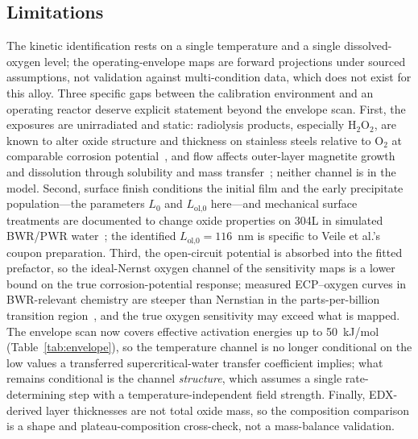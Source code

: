 \documentclass[preprint,12pt]{elsarticle}
\begin{document}
\subsection{Limitations}

The kinetic identification rests on a single temperature and a single
dissolved-oxygen level; the operating-envelope maps are forward
projections under sourced assumptions, not validation against
multi-condition data, which does not exist for this alloy. Three
specific gaps between the calibration environment and an operating
reactor deserve explicit statement beyond the envelope scan. First, the
exposures are unirradiated and static: radiolysis products, especially
H$_2$O$_2$, are known to alter oxide structure and thickness on
stainless steels relative to O$_2$ at comparable corrosion
potential~\citep{kim1999oxide}, and flow affects outer-layer
magnetite growth and dissolution through solubility and mass
transfer~\citep{lister1987release}; neither channel is in the model.
Second, surface finish conditions the initial film and the early
precipitate population---the parameters $L_0$ and $L_\text{ol,0}$
here---and mechanical surface treatments are documented to change oxide
properties on 304L in simulated BWR/PWR
water~\citep{surface_treatment_304l}; the identified $L_\text{ol,0}
= 116$~nm is specific to Veile et al.'s coupon preparation. Third, the
open-circuit potential is absorbed into the fitted prefactor, so the
ideal-Nernst oxygen channel of the sensitivity maps is a lower bound on
the true corrosion-potential response; measured ECP--oxygen curves in
BWR-relevant chemistry are steeper than Nernstian in the
parts-per-billion transition region~\citep{lin1996ecp}, and the true
oxygen sensitivity may exceed what is mapped. The envelope scan now
covers effective activation energies up to 50~kJ/mol
(Table~\ref{tab:envelope}), so the temperature channel is no longer
conditional on the low values a transferred supercritical-water transfer
coefficient implies; what remains conditional is the channel
\emph{structure}, which assumes a single rate-determining step with a
temperature-independent field strength. Finally, EDX-derived layer thicknesses are not
total oxide mass, so the composition comparison is a shape and
plateau-composition cross-check, not a mass-balance validation.
\end{document}
